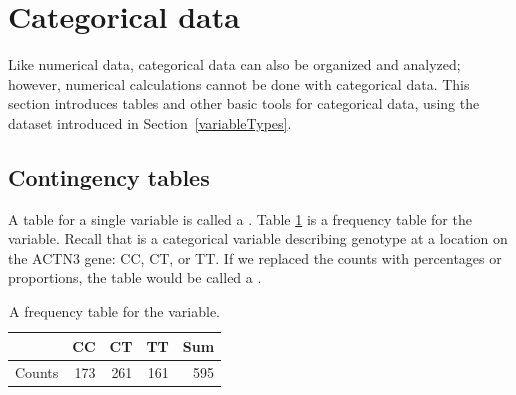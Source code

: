 
\textC{\newpage}


\section[Categorical data]{Categorical data}
\label{categoricalData}


Like numerical data, categorical data can also be organized and analyzed; however, numerical calculations cannot be done with categorical data. This section introduces tables and other basic tools for categorical data, using the  dataset introduced in Section~\ref{variableTypes}. 

\subsection{Contingency tables}
A table for a single variable is called a . Table \ref{famussFrequencyTable} is a frequency table for the  variable. Recall that  is a categorical variable describing genotype at a location on the ACTN3 gene: CC, CT, or TT. If we replaced the counts with percentages or proportions, the table would be called a .

\begin{table}[ht]
	\centering
	\begin{tabular}{rrrrr}
		\hline
		& CC & CT & TT & Sum \\ 
		\hline
		Counts & 173 & 261 & 161 & 595 \\ 
		\hline
	\end{tabular}
	\caption{A frequency table for the  variable.} 
	\label{famussFrequencyTable}
\end{table}

